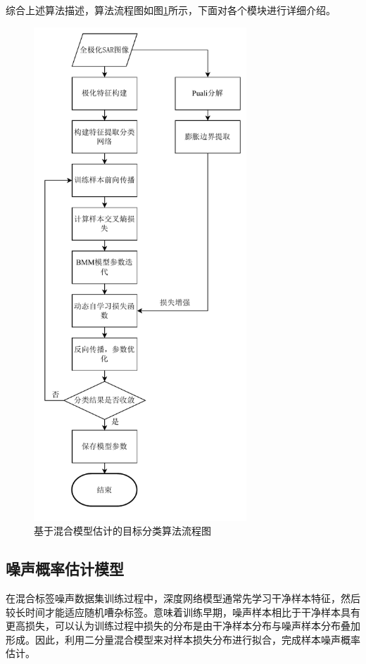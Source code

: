 综合上述算法描述，算法流程图如图\ref{fig:流程图2}所示，下面对各个模块进行详细介绍。
\begin{figure}[ht!]
    \centering
    \includegraphics[width=8cm]{pic/chapter4/流程图.pdf}
    \caption{基于混合模型估计的目标分类算法流程图}
    \label{fig:流程图2}
\end{figure}



\subsection{噪声概率估计模型}
在混合标签噪声数据集训练过程中，深度网络模型通常先学习干净样本特征，然后较长时间才能适应随机嘈杂标签。意味着训练早期，噪声样本相比于干净样本具有更高损失，可以认为训练过程中损失的分布是由干净样本分布与噪声样本分布叠加形成。因此，利用二分量混合模型来对样本损失分布进行拟合，完成样本噪声概率估计。

